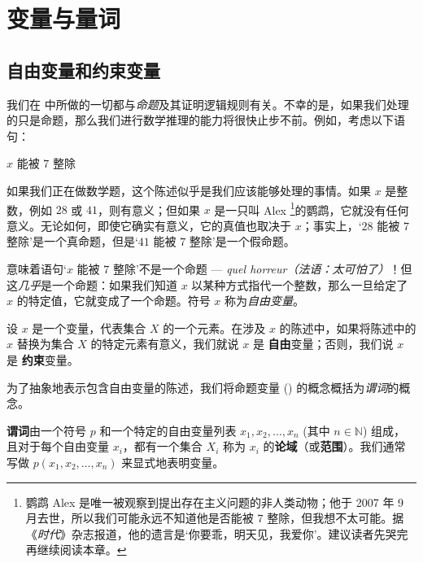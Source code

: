 \section{变量与量词}

\subsection*{自由变量和约束变量}

我们在  中所做的一切都与\textit{命题}及其证明逻辑规则有关。不幸的是，如果我们处理的只是命题，那么我们进行数学推理的能力将很快止步不前。例如，考虑以下语句：

\begin{center}
$x$ 能被 $7$ 整除
\end{center}
如果我们正在做数学题，这个陈述似乎是我们应该能够处理的事情。如果 $x$ 是整数，例如 $28$ 或 $41$，则有意义；但如果 $x$ 是一只叫 Alex \footnote{鹦鹉 Alex 是唯一被观察到提出存在主义问题的非人类动物；他于 2007 年 9 月去世，所以我们可能永远不知道他是否能被 $7$ 整除，但我想不太可能。据《\textit{时代}》杂志报道，他的遗言是`你要乖，明天见，我爱你'。建议读者先哭完再继续阅读本章。}的鹦鹉，它就没有任何意义。无论如何，即使它确实有意义，它的真值也取决于 $x$；事实上，`$28$ 能被 $7$ 整除'是一个真命题，但是`$41$ 能被 $7$ 整除'是一个假命题。

意味着语句`$x$ 能被 $7$ 整除'不是一个命题 --- \textit{quel horreur（法语：太可怕了）}！但这\textit{几乎}是一个命题：如果我们知道 $x$ 以某种方式指代一个整数，那么一旦给定了 $x$ 的特定值，它就变成了一个命题。符号 $x$ 称为\textit{自由变量}。

\begin{definition}
\label{defFreeVariable}
设 $x$ 是一个变量，代表集合 $X$ 的一个元素。在涉及 $x$ 的陈述中，如果将陈述中的 $x$ 替换为集合 $X$ 的特定元素有意义，我们就说 $x$ 是 \textbf{自由}变量；否则，我们说 $x$ 是 \textbf{约束}变量。
\end{definition}

为了抽象地表示包含自由变量的陈述，我们将命题变量 () 的概念概括为\textit{谓词}的概念。

\begin{definition}
\label{defPredicate}
\textbf{谓词}由一个符号 $p$ 和一个特定的自由变量列表 $x_1, x_2, \dots, x_n$ (其中 $n \in \mathbb{N}$) 组成，且对于每个自由变量 $x_i$，都有一个集合 $X_i$ 称为 $x_i$ 的\textbf{论域}（或\textbf{范围}）。我们通常写做 $p(x_1,x_2,\dots,x_n)$ 来显式地表明变量。
\end{definition}


